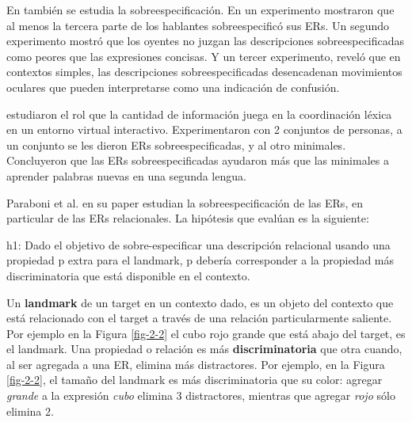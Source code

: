En \cite{Engelhardt_Bailey_Ferreira_2006} tambi\'en se estudia la sobreespecificaci\'on. En un experimento mostraron que al menos la tercera parte de los hablantes sobreespecific\'o sus ERs. Un segundo experimento mostr\'o que los oyentes no juzgan las descripciones sobreespecificadas como peores que las expresiones concisas. Y un tercer experimento, revel\'o que en contextos simples, las descripciones sobreespecificadas desencadenan movimientos oculares que pueden interpretarse como una indicaci\'on de confusi\'on. 


\cite{Lu_sasha2015} estudiaron el rol que la cantidad de informaci\'on juega en la coordinaci\'on l\'exica en un entorno virtual interactivo. Experimentaron con 2 conjuntos de personas, a un conjunto se les dieron ERs sobreespecificadas, y al otro minimales. Concluyeron que las ERs sobreespecificadas ayudaron m\'as que las minimales a aprender palabras nuevas en una segunda lengua.


Paraboni et al. en su paper \cite{acl-Paraboni15} estudian la sobreespecificaci\'on de las ERs, en particular de las ERs relacionales.
La hip\'otesis que eval\'uan es la siguiente:
\begin{it}
\begin{displayquote}h1: Dado el objetivo de sobre-especificar una descripci\'on relacional usando una propiedad p extra para el landmark, p deber\'ia corresponder a la propiedad m\'as discriminatoria que est\'a disponible en el contexto. %
\end{displayquote}
\end{it}

Un \textbf{landmark} de un target en un contexto dado, es un objeto del contexto que est\'a relacionado con el target a trav\'es de una relaci\'on particularmente saliente. Por ejemplo en la Figura \ref{fig-2-2} el cubo rojo grande que est\'a abajo del target, es el landmark.
Una propiedad o relaci\'on es m\'as \textbf{discriminatoria} que otra cuando, al ser agregada a una ER, elimina m\'as distractores. Por ejemplo, en la Figura \ref{fig-2-2}, el tama\~no del landmark es m\'as discriminatoria que su color: agregar \emph{grande} a la expresi\'on \emph{cubo} elimina 3 distractores, mientras que agregar \emph{rojo} s\'olo elimina 2.

